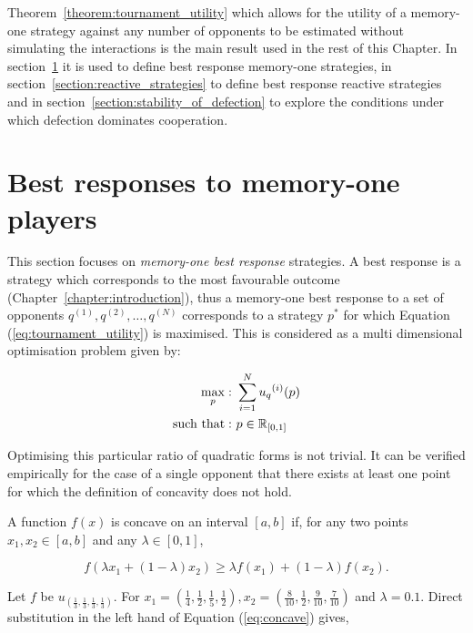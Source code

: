 Theorem~\ref{theorem:tournament_utility} which allows for the utility of a
memory-one strategy against any number of opponents to be estimated without
simulating the interactions is the main result used in the rest of this Chapter. In
section~\ref{section:best_response_mem_one} it is used to define best response
memory-one strategies, in section~\ref{section:reactive_strategies} to define best response
reactive strategies and in section~\ref{section:stability_of_defection}
to explore the conditions under which defection dominates cooperation.

\section{Best responses to memory-one players}\label{section:best_response_mem_one}

This section focuses on \textit{memory-one
best response} strategies. A best response is a strategy which
corresponds to the most favourable outcome (Chapter~\ref{chapter:introduction}), thus a memory-one
best response to a set of opponents \(q^{(1)}, q^{(2)}, \dots, q^{(N)}\) corresponds to a strategy \(p^*\) for which
Equation (\ref{eq:tournament_utility}) is maximised. This is considered as a multi
dimensional optimisation problem given by:

\begin{equation}\label{eq:mo_tournament_optimisation}
    \begin{aligned}
    \max_p: & \ \sum_{i=1} ^ {N} {u_q}^{(i)} (p)
    \\
    \text{such that}: & \ p \in \mathbb{R}_{[0, 1]}
    \end{aligned}
\end{equation}

Optimising this particular ratio of quadratic forms is not trivial. It can be
verified empirically for the case of a single opponent that there exists at
least one point for which the definition of concavity does not hold.

A function \(f(x)\) is concave on an interval \([a, b]\) if, for any two
points \(x_1, x_2 \in [a, b]\) and any \(\lambda \in [0, 1]\), 

\begin{equation}\label{eq:concave}
f (\lambda x_1 + (1 - \lambda )x_2 ) \geq \lambda f (x_1 ) + (1 - \lambda )f (x_2 ).
\end{equation}

Let \(f\) be \(u_{(\frac{1}{3}, \frac{1}{3}, \frac{1}{3}, \frac{1}{3})}\).
For \(x_1 = (\frac{1}{4}, \frac{1}{2}, \frac{1}{5} , \frac{1}{2}),
x_2 = (\frac{8}{10}, \frac{1}{2}, \frac{9}{10} , \frac{7}{10})\) and
\(\lambda=0.1\). Direct substitution in the left hand of Equation (\ref{eq:concave}) gives,

